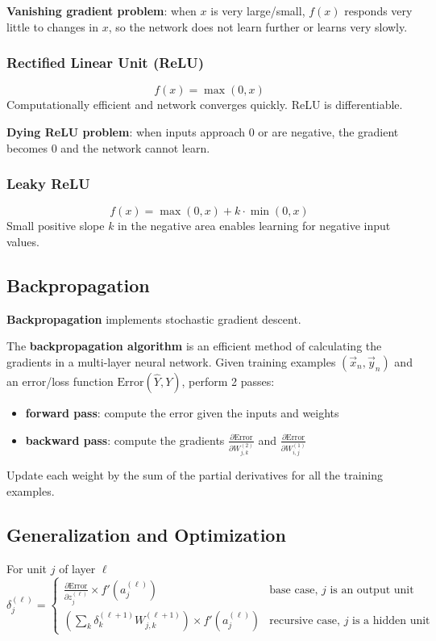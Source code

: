 \documentclass[11pt]{article}
\begin{document}
\textbf{Vanishing gradient problem}: when \(x\) is very large/small, \(f(x)\)
responds very little to changes in \(x\), so the network does not learn
further or learns very slowly.
\subsubsection{Rectified Linear Unit (ReLU)}
\label{sec:orgcf200ea}
$$ f(x) = \max (0, x) $$
Computationally efficient and network converges quickly.
ReLU is differentiable.

\textbf{Dying ReLU problem}: when inputs approach 0 or are negative,
the gradient becomes 0 and the network cannot learn.
\subsubsection{Leaky ReLU}
\label{sec:org4b2da47}
$$ f(x) = \max(0, x) + k \cdot \min(0, x) $$
Small positive slope \(k\) in the negative area enables learning for
negative input values.
\subsection{Backpropagation}
\label{sec:org5613265}
\textbf{Backpropagation} implements stochastic gradient descent.

The \textbf{backpropagation algorithm} is an efficient method of calculating the gradients
in a multi-layer neural network.
Given training examples \((\vec{x}_{n}, \vec{y}_{n})\) and an error/loss function
\(\text{Error}(\hat{Y}, Y)\), perform 2 passes:
\begin{itemize}
\item \textbf{forward pass}: compute the error given the inputs and weights
\item \textbf{backward pass}: compute the gradients \(\frac{\partial \text{Error}}{\partial W_{j, k}^{(2)}}\)
and \(\frac{\partial \text{Error}}{\partial W_{i, j}^{(1)}}\)
\end{itemize}

Update each weight by the sum of the partial derivatives for all the training examples.
\subsection{Generalization and Optimization}
\label{sec:org4f3a328}
For unit \(j\) of layer \(\ell\)
$$ \delta_{j}^{(\ell)} = \begin{cases} \frac{\partial \text{Error}}{\partial z_{j}^{(\ell)}} \times f'(a_{j}^{(\ell)}) & \text{base case, $j$ is an output unit} \\ \left( \sum_{k} \delta_{k}^{(\ell + 1)} W_{j, k}^{(\ell + 1)} \right) \times f'(a_{j}^{(\ell)}) & \text{recursive case, $j$ is a hidden unit} \end{cases} $$
\end{document}
